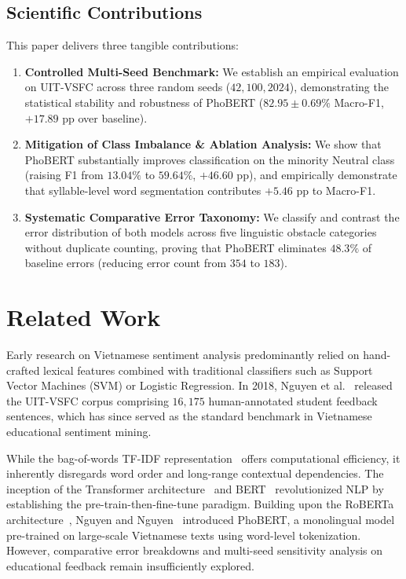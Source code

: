 \documentclass[conference]{IEEEtran}
\begin{document}
\subsection{Scientific Contributions}
This paper delivers three tangible contributions:
\begin{enumerate}
    \item \textbf{Controlled Multi-Seed Benchmark:} We establish an empirical evaluation on UIT-VSFC across three random seeds ($42, 100, 2024$), demonstrating the statistical stability and robustness of PhoBERT ($82.95 \pm 0.69\%$ Macro-F1, $+17.89\text{ pp}$ over baseline).
    \item \textbf{Mitigation of Class Imbalance \& Ablation Analysis:} We show that PhoBERT substantially improves classification on the minority Neutral class (raising F1 from $13.04\%$ to $59.64\%$, $+46.60\text{ pp}$), and empirically demonstrate that syllable-level word segmentation contributes $+5.46\text{ pp}$ to Macro-F1.
    \item \textbf{Systematic Comparative Error Taxonomy:} We classify and contrast the error distribution of both models across five linguistic obstacle categories without duplicate counting, proving that PhoBERT eliminates $48.3\%$ of baseline errors (reducing error count from $354$ to $183$).
\end{enumerate}

\section{Related Work}
Early research on Vietnamese sentiment analysis predominantly relied on hand-crafted lexical features combined with traditional classifiers such as Support Vector Machines (SVM) or Logistic Regression. In 2018, Nguyen et al.~\cite{vsfc2018} released the UIT-VSFC corpus comprising $16,175$ human-annotated student feedback sentences, which has since served as the standard benchmark in Vietnamese educational sentiment mining.

While the bag-of-words TF-IDF representation~\cite{manning2008introduction} offers computational efficiency, it inherently disregards word order and long-range contextual dependencies. The inception of the Transformer architecture~\cite{vaswani2017attention} and BERT~\cite{devlin2019bert} revolutionized NLP by establishing the pre-train-then-fine-tune paradigm. Building upon the RoBERTa architecture~\cite{liu2019roberta}, Nguyen and Nguyen~\cite{phobert2020} introduced PhoBERT, a monolingual model pre-trained on large-scale Vietnamese texts using word-level tokenization. However, comparative error breakdowns and multi-seed sensitivity analysis on educational feedback remain insufficiently explored.
\end{document}

